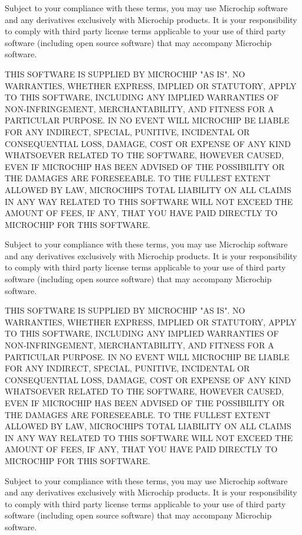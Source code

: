 Subject to your compliance with these terms, you may use Microchip software and any derivatives exclusively with Microchip products. It is your responsibility to comply with third party license terms applicable to your use of third party software (including open source software) that may accompany Microchip software.

THIS SOFTWARE IS SUPPLIED BY MICROCHIP "{}\+AS IS"{}. NO WARRANTIES, WHETHER EXPRESS, IMPLIED OR STATUTORY, APPLY TO THIS SOFTWARE, INCLUDING ANY IMPLIED WARRANTIES OF NON-\/\+INFRINGEMENT, MERCHANTABILITY, AND FITNESS FOR A PARTICULAR PURPOSE. IN NO EVENT WILL MICROCHIP BE LIABLE FOR ANY INDIRECT, SPECIAL, PUNITIVE, INCIDENTAL OR CONSEQUENTIAL LOSS, DAMAGE, COST OR EXPENSE OF ANY KIND WHATSOEVER RELATED TO THE SOFTWARE, HOWEVER CAUSED, EVEN IF MICROCHIP HAS BEEN ADVISED OF THE POSSIBILITY OR THE DAMAGES ARE FORESEEABLE. TO THE FULLEST EXTENT ALLOWED BY LAW, MICROCHIP\textquotesingle{}S TOTAL LIABILITY ON ALL CLAIMS IN ANY WAY RELATED TO THIS SOFTWARE WILL NOT EXCEED THE AMOUNT OF FEES, IF ANY, THAT YOU HAVE PAID DIRECTLY TO MICROCHIP FOR THIS SOFTWARE.

Subject to your compliance with these terms, you may use Microchip software and any derivatives exclusively with Microchip products. It is your responsibility to comply with third party license terms applicable to your use of third party software (including open source software) that may accompany Microchip software.

THIS SOFTWARE IS SUPPLIED BY MICROCHIP "{}\+AS IS"{}. NO WARRANTIES, WHETHER EXPRESS, IMPLIED OR STATUTORY, APPLY TO THIS SOFTWARE, INCLUDING ANY IMPLIED WARRANTIES OF NON-\/\+INFRINGEMENT, MERCHANTABILITY, AND FITNESS FOR A PARTICULAR PURPOSE. IN NO EVENT WILL MICROCHIP BE LIABLE FOR ANY INDIRECT, SPECIAL, PUNITIVE, INCIDENTAL OR CONSEQUENTIAL LOSS, DAMAGE, COST OR EXPENSE OF ANY KIND WHATSOEVER RELATED TO THE SOFTWARE, HOWEVER CAUSED, EVEN IF MICROCHIP HAS BEEN ADVISED OF THE POSSIBILITY OR THE DAMAGES ARE FORESEEABLE. TO THE FULLEST EXTENT ALLOWED BY LAW, MICROCHIP\textquotesingle{}S TOTAL LIABILITY ON ALL CLAIMS IN ANY WAY RELATED TO THIS SOFTWARE WILL NOT EXCEED THE AMOUNT OF FEES, IF ANY, THAT YOU HAVE PAID DIRECTLY TO MICROCHIP FOR THIS SOFTWARE.

Subject to your compliance with these terms, you may use Microchip software and any derivatives exclusively with Microchip products. It is your responsibility to comply with third party license terms applicable to your use of third party software (including open source software) that may accompany Microchip software.

